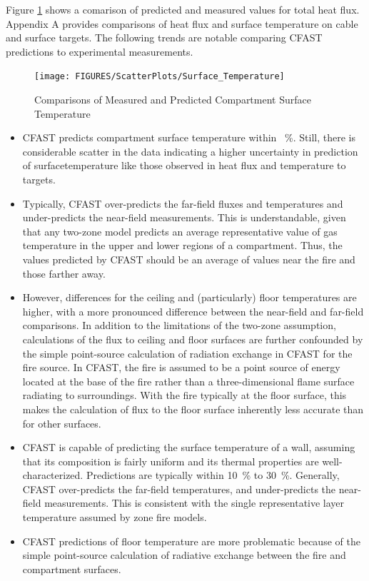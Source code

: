 Figure \ref{fig:Surface_Temperature_Scatter} shows a comarison of predicted and measured values for total heat flux. Appendix A provides comparisons of heat flux and surface temperature on cable and surface targets.  The following trends are notable comparing CFAST predictions to experimental measurements.

\begin{figure}
\begin{center}
\texttt{[image: FIGURES/ScatterPlots/Surface\_Temperature]}
\end{center}
\caption{Comparisons of Measured and Predicted  Compartment Surface Temperature} \label{fig:Surface_Temperature_Scatter}
\end{figure}

\begin{itemize}
\item CFAST predicts compartment surface temperature within \Surfacetempavg ~\%.  Still, there is considerable scatter in the data indicating a higher uncertainty in prediction of surfacetemperature  like those observed in heat flux and temperature to targets.
\item Typically, CFAST over-predicts the far-field fluxes and temperatures and under-predicts the near-field measurements.  This is understandable, given that any two-zone model predicts an average representative value of gas temperature in the upper and lower regions of a compartment.  Thus, the values predicted by CFAST should be an average of values near the fire and those farther away.
\item However, differences for the ceiling and (particularly) floor temperatures are higher, with a more pronounced difference between the near-field and far-field comparisons.  In addition to the limitations of the two-zone assumption, calculations of the flux to ceiling and floor surfaces are further confounded by the simple point-source calculation of radiation exchange in CFAST for the fire source.  In CFAST, the fire is assumed to be a point source of energy located at the base of the fire rather than a three-dimensional flame surface radiating to surroundings.  With the fire typically at the floor surface, this makes the calculation of flux to the floor surface inherently less accurate than for other surfaces.
\item CFAST is capable of predicting the surface temperature of a wall, assuming that its composition is fairly uniform and its thermal properties are well-characterized.  Predictions are typically within 10~\% to 30~\%.  Generally, CFAST over-predicts the far-field temperatures, and under-predicts the near-field measurements.  This is consistent with the single representative layer temperature assumed by zone fire models.
\item CFAST predictions of floor temperature are more problematic because of the simple point-source calculation of radiative exchange between the fire and compartment surfaces.
\end{itemize}

